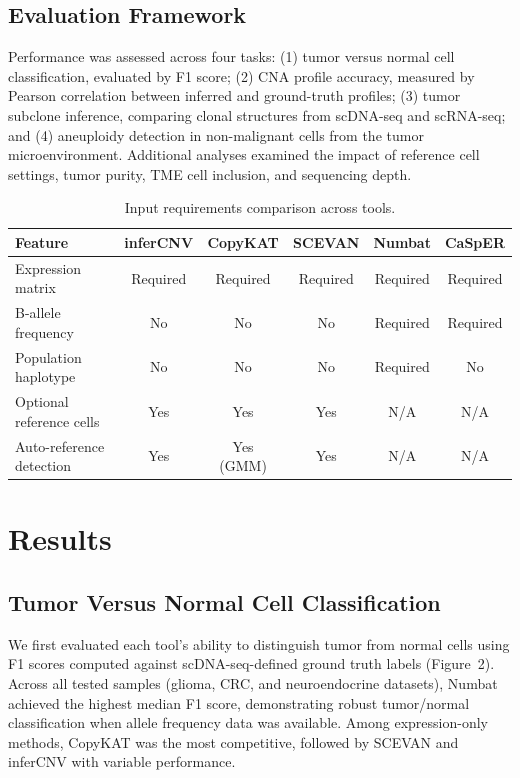 \documentclass[11pt]{article}
\begin{document}
\subsection{Evaluation Framework}

Performance was assessed across four tasks: (1) tumor versus normal cell classification, evaluated by F1 score; (2) CNA profile accuracy, measured by Pearson correlation between inferred and ground-truth profiles; (3) tumor subclone inference, comparing clonal structures from scDNA-seq and scRNA-seq; and (4) aneuploidy detection in non-malignant cells from the tumor microenvironment. Additional analyses examined the impact of reference cell settings, tumor purity, TME cell inclusion, and sequencing depth.

\begin{table}[H]
\centering
\caption{Input requirements comparison across tools.}
\label{tab:inputs}
\begin{tabular}{lccccc}
\toprule
Feature & inferCNV & CopyKAT & SCEVAN & Numbat & CaSpER \\
\midrule
Expression matrix & Required & Required & Required & Required & Required \\
B-allele frequency & No & No & No & Required & Required \\
Population haplotype & No & No & No & Required & No \\
Optional reference cells & Yes & Yes & Yes & N/A & N/A \\
Auto-reference detection & Yes & Yes (GMM) & Yes & N/A & N/A \\
\bottomrule
\end{tabular}
\end{table}

\section{Results}

\subsection{Tumor Versus Normal Cell Classification}

We first evaluated each tool's ability to distinguish tumor from normal cells using F1 scores computed against scDNA-seq-defined ground truth labels (Figure~2). Across all tested samples (glioma, CRC, and neuroendocrine datasets), Numbat achieved the highest median F1 score, demonstrating robust tumor/normal classification when allele frequency data was available. Among expression-only methods, CopyKAT was the most competitive, followed by SCEVAN and inferCNV with variable performance.
\end{document}
